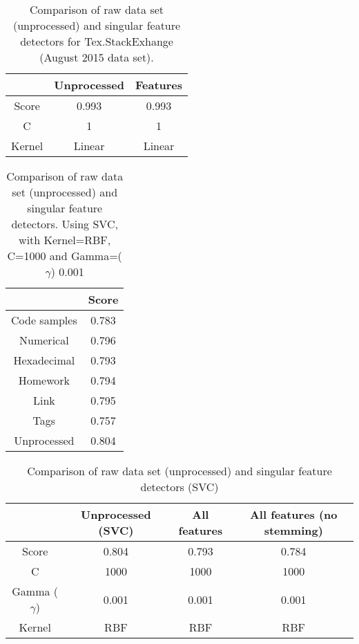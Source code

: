 \begin{comment}
Potentially move "all this failed and went wrong" here
\end{comment}



\begin{table}[tbp]
	\centering
	\begin{tabular}{| c | c | c |}
		\hline
		~ 			& Unprocessed		& Features	\\ \hline
		Score 		& 0.993				& 0.993		\\ \hline
		C			& 1					& 1			\\ \hline
		Kernel		& Linear			& Linear	\\ \hline
	\end{tabular}
	\caption{Comparison of raw data set (unprocessed) and singular feature detectors for Tex.StackExhange (August 2015 data set).}
	\label{tab:singular_feature_detector_tex}
\end{table}


\begin{table}[tbp]
	\centering
	\begin{tabular}{| c | c |}
		\hline
		~ 				& Score	\\ \hline
		Code samples 	& 0.783	\\ \hline
		Numerical		& 0.796	\\ \hline
		Hexadecimal		& 0.793	\\ \hline
		Homework 		& 0.794	\\ \hline
		Link			& 0.795	\\ \hline
		Tags			& 0.757	\\ \hline
		Unprocessed		& 0.804 \\ \hline
	\end{tabular}
	\caption{Comparison of raw data set (unprocessed) and singular feature detectors. Using SVC, with Kernel=RBF, C=1000 and Gamma=($\gamma$) 0.001}
	\label{tab:singular_feature_detector_so}
\end{table}


\begin{table}[tbp]
	\centering
	\begin{tabular}{| c | c | c | c |}
		\hline
		~ 					& Unprocessed (SVC)	& All features	& All features (no stemming)	\\ \hline
		Score 				& 0.804				& 0.793			& 0.784							\\ \hline
		C					& 1000				& 1000			& 1000							\\ \hline
		Gamma ($\gamma$)	& 0.001				& 0.001			&  0.001							\\ \hline
		Kernel				& RBF				& RBF			& RBF							\\ \hline
	\end{tabular}
	\caption{Comparison of raw data set (unprocessed) and singular feature detectors (SVC)}
	\label{tab:unprocessed_vs_all_feature_detectors_svc_so}
\end{table}

